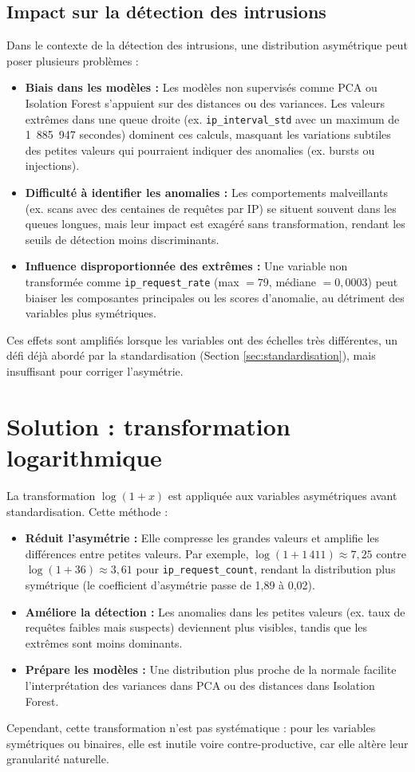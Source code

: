 \documentclass[a4paper,12pt]{article}
\begin{document}
\subsection{Impact sur la détection des intrusions}

Dans le contexte de la détection des intrusions, une distribution asymétrique peut poser plusieurs problèmes :
\begin{itemize}
  \item \textbf{Biais dans les modèles :} Les modèles non supervisés comme PCA ou Isolation Forest s'appuient sur des distances ou des variances. Les valeurs extrêmes dans une queue droite (ex. \texttt{ip\_interval\_std} avec un maximum de 1~885~947 secondes) dominent ces calculs, masquant les variations subtiles des petites valeurs qui pourraient indiquer des anomalies (ex. bursts ou injections).
  \item \textbf{Difficulté à identifier les anomalies :} Les comportements malveillants (ex. scans avec des centaines de requêtes par IP) se situent souvent dans les queues longues, mais leur impact est exagéré sans transformation, rendant les seuils de détection moins discriminants.
  \item \textbf{Influence disproportionnée des extrêmes :} Une variable non transformée comme \texttt{ip\_request\_rate} (max $= 79$, médiane $= 0{,}0003$) peut biaiser les composantes principales ou les scores d'anomalie, au détriment des variables plus symétriques.
\end{itemize}
Ces effets sont amplifiés lorsque les variables ont des échelles très différentes, un défi déjà abordé par la standardisation (Section \ref{sec:standardisation}), mais insuffisant pour corriger l'asymétrie.

\section{Solution : transformation logarithmique}

La transformation $\log(1 + x)$ est appliquée aux variables asymétriques avant standardisation. Cette méthode :
\begin{itemize}
  \item \textbf{Réduit l'asymétrie :} Elle compresse les grandes valeurs et amplifie les différences entre petites valeurs. Par exemple, $\log(1 + 1\,411) \approx 7{,}25$ contre $\log(1 + 36) \approx 3{,}61$ pour \texttt{ip\_request\_count}, rendant la distribution plus symétrique (le coefficient d'asymétrie passe de 1,89 à 0,02).
  \item \textbf{Améliore la détection :} Les anomalies dans les petites valeurs (ex. taux de requêtes faibles mais suspects) deviennent plus visibles, tandis que les extrêmes sont moins dominants.
  \item \textbf{Prépare les modèles :} Une distribution plus proche de la normale facilite l'interprétation des variances dans PCA ou des distances dans Isolation Forest.
\end{itemize}
Cependant, cette transformation n'est pas systématique : pour les variables symétriques ou binaires, elle est inutile voire contre-productive, car elle altère leur granularité naturelle.
\end{document}
